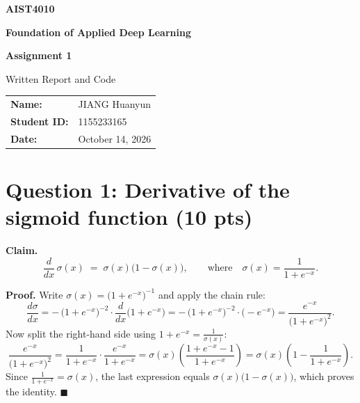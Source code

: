 \documentclass[11pt,a4paper]{article}
\begin{document}
\begin{titlepage}
  \centering
  \vspace*{3cm}

  {\Huge\bfseries AIST4010\par}
  \vspace{0.3cm}
  {\Huge\bfseries Foundation of Applied Deep Learning\par}
  \vspace{1.5cm}
  {\LARGE\bfseries Assignment 1\par}
  \vspace{1.5cm}
  {\Large Written Report and Code\par}
  \vspace{2cm}

  \begin{tabular}{ll}
    \Large\textbf{Name:} & \Large JIANG Huanyun \\[0.6cm]
    \Large\textbf{Student ID:} & \Large 1155233165 \\[0.6cm]
    \Large\textbf{Date:} & \Large October 14, 2026 \\
  \end{tabular}

  \vfill
\end{titlepage}

\section{Question 1: Derivative of the sigmoid function (10 pts)}

\textbf{Claim.}
\[
\frac{d}{dx}\,\sigma(x) \;=\; \sigma(x)\bigl(1-\sigma(x)\bigr),
\qquad\text{where}\quad \sigma(x)=\frac{1}{1+e^{-x}} .
\]

\textbf{Proof.} Write $\sigma(x) = \bigl(1+e^{-x}\bigr)^{-1}$ and apply the chain rule:
\begin{equation}
\frac{d\sigma}{dx}
= -\,\bigl(1+e^{-x}\bigr)^{-2}\cdot \frac{d}{dx}\bigl(1+e^{-x}\bigr)
= -\,\bigl(1+e^{-x}\bigr)^{-2}\cdot\bigl(-e^{-x}\bigr)
= \frac{e^{-x}}{\bigl(1+e^{-x}\bigr)^2} .
\end{equation}
Now split the right-hand side using $1+e^{-x}=\frac{1}{\sigma(x)}$:
\begin{equation}
\frac{e^{-x}}{\bigl(1+e^{-x}\bigr)^2}
= \frac{1}{1+e^{-x}}\cdot\frac{e^{-x}}{1+e^{-x}}
= \sigma(x)\left(\frac{1+e^{-x}-1}{1+e^{-x}}\right)
= \sigma(x)\left(1-\frac{1}{1+e^{-x}}\right) .
\end{equation}
Since $\frac{1}{1+e^{-x}}=\sigma(x)$, the last expression equals
$\sigma(x)\bigl(1-\sigma(x)\bigr)$, which proves the identity. $\blacksquare$
\end{document}
